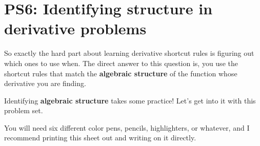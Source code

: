 

\usepackage{parskip,scalerel}

\newcommand{\diff}[1]{\frac{d}{d#1}}


\section{PS6: Identifying structure in derivative problems}

So exactly the hard part about learning derivative shortcut rules is figuring out which ones to use when. The direct answer to this question is, you use the shortcut rules that match the \textbf{algebraic structure} of the function whose derivative you are finding.

Identifying \textbf{algebraic structure} takes some practice! Let's get into it with this problem set.

You will need six
different color pens, pencils, highlighters, or whatever, and I recommend printing this sheet out and writing on it directly.

